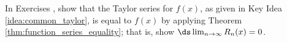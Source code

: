 {\noindent In Exercises}
{, show that the Taylor series for $f(x)$, as given in Key Idea \ref{idea:common_taylor}, is equal to $f(x)$ by applying Theorem \ref{thm:function_series_equality}; that is, show $\ds \lim_{n\to\infty}R_n(x) =0$.
}
